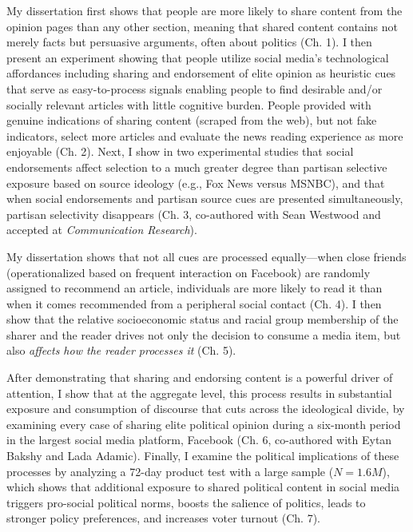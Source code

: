 \documentclass[12pt]{article}
\begin{document}
My dissertation first shows that people are more likely to share content from the opinion pages than any other section, meaning that shared content contains not merely facts but persuasive arguments, often about politics (Ch. 1).  I then present an experiment showing that people utilize social media's technological affordances including sharing and endorsement of elite opinion as heuristic cues that serve as easy-to-process signals enabling people to find desirable and/or socially relevant articles with little cognitive burden.  People provided with genuine indications of sharing content (scraped from the web), but not fake indicators, select more articles and evaluate the news reading experience as more enjoyable (Ch. 2).  Next, I show in two experimental studies that social endorsements affect selection to a much greater degree than partisan selective exposure based on source ideology (e.g., Fox News versus MSNBC), and that when social endorsements and partisan source cues are presented simultaneously, partisan selectivity disappears (Ch. 3, co-authored with Sean Westwood and accepted at \emph{Communication Research}).  

My dissertation shows that not all cues are processed equally---when close friends (operationalized based on frequent interaction on Facebook) are randomly assigned to recommend an article, individuals are more likely to read it than when it comes recommended from a peripheral social contact (Ch. 4).  I then show that the relative socioeconomic status and racial group membership of the sharer and the reader drives not only the decision to consume a media item, but also \emph{affects how the reader processes it} (Ch. 5).  

After demonstrating that sharing and endorsing content is a powerful driver of attention, I show that at the aggregate level, this process results in substantial exposure and consumption of discourse that cuts across the ideological divide, by examining every case of sharing elite political opinion during a six-month period in the largest social media platform, Facebook (Ch. 6, co-authored with Eytan Bakshy and Lada Adamic).  Finally, I examine the political implications of these processes by analyzing a 72-day product test with a large sample ($N=1.6M$), which shows that additional exposure to shared political content in social media triggers pro-social political norms, boosts the salience of politics, leads to stronger policy preferences, and increases voter turnout (Ch. 7).  

\end{document}
